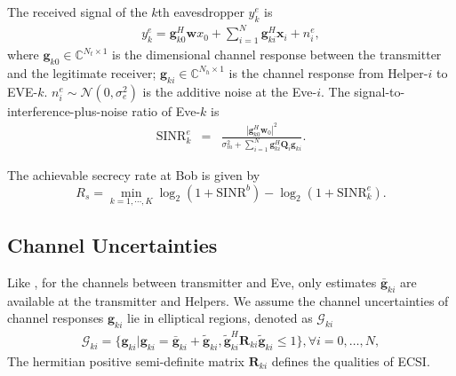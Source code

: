 \documentclass[journal]{IEEEtran}
\begin{document}
The received signal of the $k$th eavesdropper $y^e_k$ is
\begin{eqnarray}
y_{k}^e = \mathbf{g}_{k0}^H\mathbf{w}x_0 + \sum_{i = 1}^N\mathbf{g}_{ki}^H\mathbf{x}_i + n^e_i,
\end{eqnarray}
where $\mathbf{g}_{k0} \in \mathbb{C}^{N_t \times 1}$ is the dimensional channel response between the transmitter and the legitimate receiver; $\mathbf{g}_{ki} \in \mathbb{C}^{N_h \times 1}$ is the channel response from Helper-$i$ to EVE-$k$. $n^e_i \sim \mathcal{N}(0,\sigma_e^2)$ is the additive noise at the Eve-$i$.  
The signal-to-interference-plus-noise ratio of Eve-$k$ is
\begin{eqnarray}
\mathrm{SINR}^e_k &=& \frac{\left| \mathbf{g}_{k0}^H\mathbf{w}_{0}\right|^2}{\sigma_m^2 + \sum_{i=1}^{N}\mathbf{g}_{ki}^H\mathbf{Q}_{i}\mathbf{g}_{ki}} \label{eq:secure_capacity}.
\end{eqnarray}

The achievable secrecy rate at Bob is given by \cite{6728676}
\begin{equation}
R_s = \min_{k = 1,\cdots,K}\log_2\left(1 + \mathrm{SINR}^b\right)-\log_2\left(1 + \mathrm{SINR}^e_k\right).
\end{equation}


\subsection{Channel Uncertainties} \label{sec:Channel Uncertainties}
Like \cite{huang_robust_2012}, for the channels  between transmitter and  Eve, only estimates $\bar{\mathbf{g}}_{ki}$ are available at the transmitter and Helpers. We assume the channel uncertainties of channel responses $\mathbf{g}_{ki}$ lie in elliptical regions, denoted as $\mathcal{G}_{ki}$
\begin{eqnarray}
\mathcal{G}_{ki} = \{\mathbf{g}_{ki}|\mathbf{g}_{ki} = \bar{\mathbf{g}}_{ki} + \tilde{\mathbf{g}}_{ki}, \tilde{\mathbf{g}}_{ki}^H \mathbf{R}_{ki}\tilde{\mathbf{g}}_{ki} \leq 1\},\forall i = 0,\ldots, N,
\end{eqnarray}
The hermitian positive semi-definite  matrix $\mathbf{R}_{ki}$ defines the qualities of ECSI. 
\end{document}
